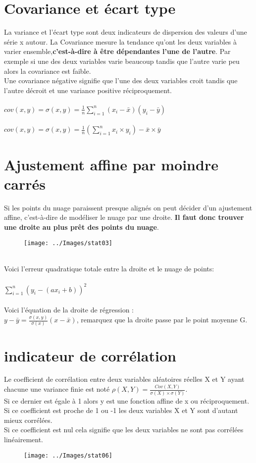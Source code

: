 \documentclass[a4paper]{report}
\begin{document}
    \pagebreak
    \section{Covariance et écart type}
    La variance et l'écart type sont deux indicateurs de dispersion des valeurs d'une série x autour. La Covariance mesure la tendance qu'ont les deux variables à varier ensemble,\textbf{c'est-à-dire à être dépendantes l'une de l'autre}. Par exemple si une des deux variables varie beaucoup tandis que l'autre varie peu alors la covariance est faible. \\
    Une covariance négative signifie que l'une des deux variables croit tandis que l'autre décroit et une variance positive réciproquement. \\
    \\
    $cov(x,y) = \sigma(x,y) = \frac{1}{n} \sum_{i=1}^n(x_i-\bar{x})(y_i-\bar{y})$
    \\ \\
    $cov(x,y) = \sigma(x,y) = \frac{1}{n} (\sum_{i=1}^nx_i \times y_i) - \bar{x} \times \bar{y}$
    \pagebreak
    \section{Ajustement affine par moindre carrés}
    Si les points du nuage paraissent presque alignés on peut décider d'un ajustement affine, c'est-à-dire de modéliser le nuage par une droite. \textbf{Il faut donc trouver une droite au plus prêt des points du nuage}.
    \begin{figure}[!h]
        \texttt{[image: ../Images/stat03]}
    \end{figure} \\
    Voici l'erreur quadratique totale entre la droite et le nuage de points: \\ \\
    $\sum_{i=1}^n(y_i - (ax_i+b))^2$
    \\ \\
    Voici l'équation de la droite de régression :\\
    $y -\bar{y} = \frac{\sigma(x,y)}{\sigma(x)} (x-\bar{x}) $, remarquez que la droite passe par le point moyenne G.
    
    \pagebreak
    \section{indicateur de corrélation}
    Le coefficient de corrélation entre deux variables aléatoires réelles X et Y ayant chacune une variance finie est noté $\rho(X,Y) = \frac{Cov(X,Y)}{\sigma(X) \times \sigma(Y)}$. \\
    Si ce dernier est égale à 1 alors y est une fonction affine de x ou réciproquement. \\
    Si ce coefficient est proche de 1 ou -1 les deux variables X et Y sont d'autant mieux corrélées. \\
    Si ce coefficient est nul cela signifie que les deux variables ne sont pas corrélées linéairement.
    \begin{figure}[!h]
        \texttt{[image: ../Images/stat06]}
    \end{figure}
    \pagebreak
\end{document}
